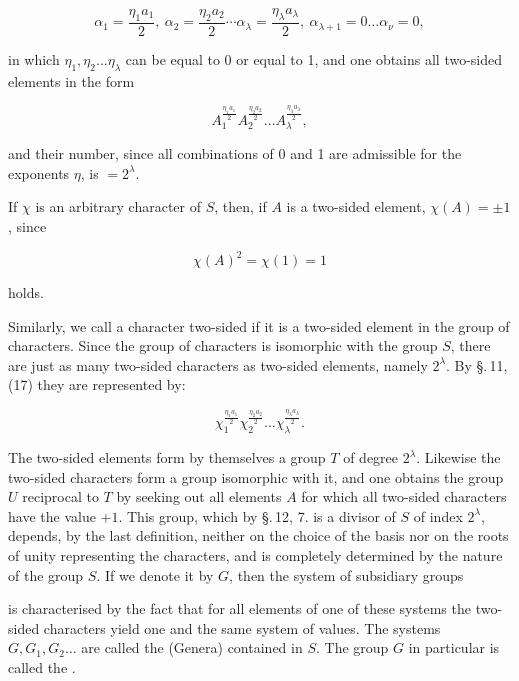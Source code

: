 
\[
\alpha_1 = \frac{\eta_1 a_1}{2},\ \alpha_2 = \frac{\eta_2 a_2}{2} \cdots \alpha_\lambda = \frac{\eta_\lambda a_\lambda}{2},\ \alpha_{\lambda+1}=0 \ldots \alpha_\nu = 0,
\]

in which $\eta_1, \eta_2 \ldots \eta_\lambda$ can be equal to 0 or equal to 1, and one obtains all two-sided elements in the form

\[
A_1^{\frac{\eta_1 a_1}{2}} A_2^{\frac{\eta_2 a_2}{2}} \ldots A_\lambda^{\frac{\eta_\lambda a_\lambda}{2}},
\]

and their number, since all combinations of 0 and 1 are admissible for the exponents $\eta$, is $= 2^\lambda$.

If $\chi$ is an arbitrary character of $S$, then, if $A$ is a two-sided element, $\chi(A) = \pm 1$, since

\[
\chi(A)^2 = \chi(1) = 1
\]

holds.

Similarly, we call a character two-sided if it is a two-sided element in the group of characters. Since the group of characters is isomorphic with the group $S$, there are just as many two-sided characters as two-sided elements, namely $2^\lambda$. By \S.\,11, (17) they are represented by:

\[
\chi_1^{\frac{\eta_1 a_1}{2}} \chi_2^{\frac{\eta_2 a_2}{2}} \ldots \chi_\lambda^{\frac{\eta_\lambda a_\lambda}{2}}.
\]


The two-sided elements form by themselves a group $T$ of degree $2^\lambda$. Likewise the two-sided characters form a group isomorphic with it, and one obtains the group $U$ reciprocal to $T$ by seeking out all elements $A$ for which all two-sided characters have the value $+1$. This group, which by \S.\,12, 7. is a divisor of $S$ of index $2^\lambda$, depends, by the last definition, neither on the choice of the basis nor on the roots of unity representing the characters, and is completely determined by the nature of the group $S$. If we denote it by $G$, then the system of subsidiary groups


is characterised by the fact that for all elements of one of these systems the two-sided characters yield one and the same system of values. The systems $G, G_1, G_2 \ldots$ are called the  (Genera) contained in $S$. The group $G$ in particular is called the .
